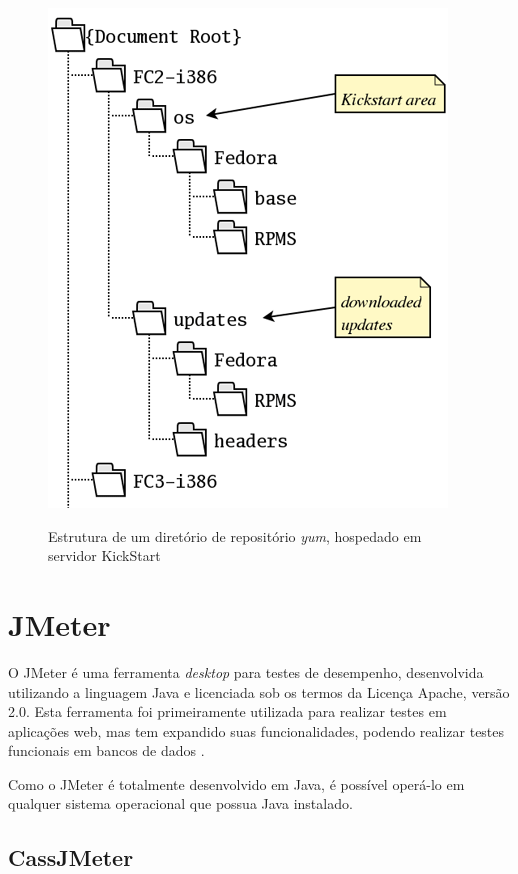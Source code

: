     \begin{figure}[htb]
    \centering
    \includegraphics[scale=0.60]{imagens/kickstart.png}
    \caption{Estrutura de um diretório de repositório \textit{yum}, hospedado em servidor KickStart} \cite{McCallum2005}
    \label{fig:kickstartdir}
    \end{figure} 





\section{JMeter}

O JMeter é uma ferramenta \textit{desktop} para testes de desempenho, desenvolvida utilizando a linguagem Java e licenciada sob os termos da Licença Apache, versão 2.0. Esta ferramenta foi primeiramente utilizada para realizar testes em aplicações web, mas tem expandido suas funcionalidades, podendo realizar testes funcionais em bancos de dados \cite{De2013}.

Como o JMeter é totalmente desenvolvido em Java, é possível operá-lo em qualquer sistema operacional que possua Java instalado.

\subsection{CassJMeter}
\label{sec:cassjmeter}

